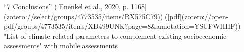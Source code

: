 
“7 Conclusions” ([Enenkel et al., 2020, p. 1168](zotero://select/groups/4773535/items/RX575C79)) ([pdf](zotero://open-pdf/groups/4773535/items/XD499UNK?page=8&annotation=YSUFWHHF))
"List of climate-related parameters to complement existing socioecenomic assessments" with mobile assessments


